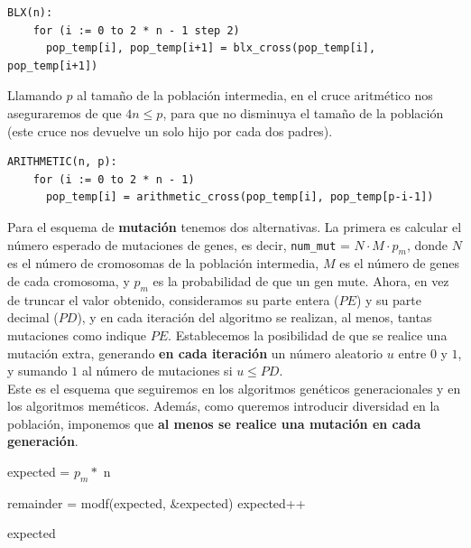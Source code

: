\documentclass[12pt]{article}
\begin{document}
\begin{verbatim}
BLX(n):
    for (i := 0 to 2 * n - 1 step 2)
      pop_temp[i], pop_temp[i+1] = blx_cross(pop_temp[i], pop_temp[i+1])
\end{verbatim}

Llamando $p$ al tamaño de la población intermedia, en el cruce aritmético nos aseguraremos de que $4n \leq p$, para que no disminuya el tamaño de la población (este cruce nos devuelve un solo hijo por cada dos padres).

\begin{verbatim}
ARITHMETIC(n, p):
    for (i := 0 to 2 * n - 1)
      pop_temp[i] = arithmetic_cross(pop_temp[i], pop_temp[p-i-1])
\end{verbatim}

Para el esquema de \textbf{mutación} tenemos dos alternativas. La primera es calcular el número esperado de mutaciones de genes, es decir, \verb|num_mut| = $N \cdot M \cdot p_m$, donde $N$ es el número de cromosomas de la población intermedia, $M$ es el número de genes de cada cromosoma, y $p_m$ es la probabilidad de que un gen mute. Ahora, en vez de truncar el valor obtenido, consideramos su parte entera ($PE$) y su parte decimal ($PD$), y en cada iteración del algoritmo se realizan, al menos, tantas mutaciones como indique $PE$. Establecemos la posibilidad de que se realice una mutación extra, generando \textbf{en cada iteración} un número aleatorio $u$ entre $0$ y $1$, y sumando $1$ al número de mutaciones si $u \leq PD$.\\
	
Este es el esquema que seguiremos en los algoritmos genéticos generacionales y en los algoritmos meméticos. Además, como queremos introducir diversidad en la población, imponemos que \textbf{al menos se realice una mutación en cada generación}. 

\begin{algorithm}[h]
\begin{algorithmic}

    \State expected = $p_m \ast$ n  
    
        \State {}
    \EndIf
    
    \State remainder = modf(expected, $\&$expected) 
        \State expected++
    \EndIf
    
    \State \Return expected
\EndFunction
  
\end{algorithmic}
\end{algorithm}
\end{document}
